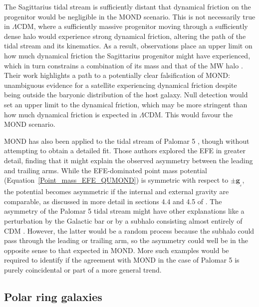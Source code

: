 \documentclass[fleqn,usenatbib,useAMS]{mnras} %
\begin{document}
The Sagittarius tidal stream is sufficiently distant that dynamical friction on the progenitor would be negligible in the MOND scenario. This is not necessarily true in $\Lambda$CDM, where a sufficiently massive progenitor moving through a sufficiently dense halo would experience strong dynamical friction, altering the path of the tidal stream and its kinematics. As a result, observations place an upper limit on how much dynamical friction the Sagittarius progenitor might have experienced, which in turn constrains a combination of its mass and that of the MW halo \citep{Dierickx_2017}. Their work highlights a path to a potentially clear falsification of MOND: unambiguous evidence for a satellite experiencing dynamical friction despite being outside the baryonic distribution of the host galaxy. Null detection would set an upper limit to the dynamical friction, which may be more stringent than how much dynamical friction is expected in $\Lambda$CDM. This would favour the MOND scenario.

MOND has also been applied to the tidal stream of Palomar 5 \citep{Thomas_2018}, though without attempting to obtain a detailed fit. Those authors explored the EFE in greater detail, finding that it might explain the observed asymmetry between the leading and trailing arms. While the EFE-dominated point mass potential (Equation~\ref{Point_mass_EFE_QUMOND}) is symmetric with respect to $\pm \bm{g}_{_e}$, the potential becomes asymmetric if the internal and external gravity are comparable, as discussed in more detail in sections 4.4 and 4.5 of \citet{Banik_2020_M33}. The asymmetry of the Palomar 5 tidal stream might have other explanations like a perturbation by the Galactic bar \citep{Bonaca_2020} or by a subhalo consisting almost entirely of CDM \citep{Bovy_2019}. However, the latter would be a random process because the subhalo could pass through the leading or trailing arm, so the asymmetry could well be in the opposite sense to that expected in MOND. More such examples would be required to identify if the agreement with MOND in the case of Palomar 5 is purely coincidental or part of a more general trend.



\subsection{Polar ring galaxies}
\label{Polar_ring_galaxies}
\end{document}
